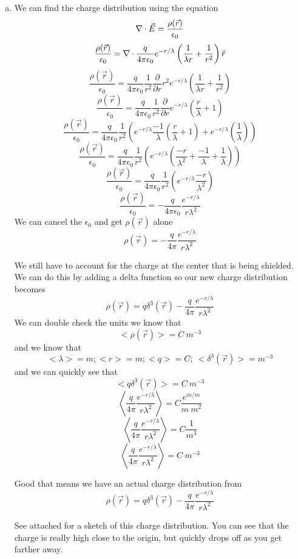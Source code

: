 \documentclass[11pt]{article}
\numberwithin{equation}{section}
\newcommand{\grad}{\bold\nabla}
\newcommand{\vecE}{\vec{E}}
\begin{document}
\begin{enumerate}[(a)]
\item
We can find the charge distribution using the equation
$$\grad\cdot\vecE = \frac{\rho(\vec{r})}{\epsilon_0}$$
$$\frac{\rho(\vec{r})}{\epsilon_0} = \grad\cdot\frac{q}{4\pi\epsilon_0}e^{-r/\lambda}\left(\frac{1}{\lambda r}+\frac{1}{r^{2}}\right)\hat{r}$$
$$\frac{\rho(\vec{r})}{\epsilon_0} = \frac{q}{4\pi\epsilon_0}\frac{1}{r^2}\frac{\partial}{\partial r}r^2e^{-r/\lambda}\left(\frac{1}{\lambda r}+\frac{1}{r^{2}}\right)$$
$$\frac{\rho(\vec{r})}{\epsilon_0} = \frac{q}{4\pi\epsilon_0}\frac{1}{r^2}\frac{\partial}{\partial r}e^{-r/\lambda}\left(\frac{r}{\lambda }+1\right)$$
$$\frac{\rho(\vec{r})}{\epsilon_0} = \frac{q}{4\pi\epsilon_0}\frac{1}{r^2}\left(e^{-r/\lambda}\frac{-1}{\lambda}\left(\frac{r}{\lambda }+1\right) + e^{-r/\lambda}\left(\frac{1}{\lambda}\right)\right)$$
$$\frac{\rho(\vec{r})}{\epsilon_0} = \frac{q}{4\pi\epsilon_0}\frac{1}{r^2}\left(e^{-r/\lambda}\left(\frac{-r}{\lambda^2}+\frac{-1}{\lambda} + \frac{1}{\lambda}\right)\right)$$
$$\frac{\rho(\vec{r})}{\epsilon_0} = \frac{q}{4\pi\epsilon_0}\frac{1}{r^2}\left(e^{-r/\lambda}\frac{-r}{\lambda^2}\right)$$
$$\frac{\rho(\vec{r})}{\epsilon_0} = -\frac{q}{4\pi\epsilon_0}\frac{e^{-r/\lambda}}{r\lambda^2}$$
We can cancel the $\epsilon_0$ and get $\rho(\vec{r})$ alone
$$\rho(\vec{r})= -\frac{q}{4\pi}\frac{e^{-r/\lambda}}{r\lambda^2}$$


We still have to account for the charge at the center that is being shielded. We can do this by adding a delta function so our new charge distribution becomes
$$\rho(\vec{r})=q\delta^3(\vec{r}) - \frac{q}{4\pi}\frac{e^{-r/\lambda}}{r\lambda^2}$$
We can double check the units we know that $$<\rho(\vec{r})> = C\ m^{-3}$$
and we know that 
$$<\lambda> = m; <r> = m; <q>=C ;\ <\delta^3(\vec{r})> = m^{-3}$$
and we can quickly see that
$$<q\delta^3(\vec{r})> = C\ m^{-3}$$
$$\left<\frac{q}{4\pi}\frac{e^{-r/\lambda}}{r\lambda^2}\right> = C \frac{e^{m/m}}{m\ m^2}$$
$$\left<\frac{q}{4\pi}\frac{e^{-r/\lambda}}{r\lambda^2}\right> = C \frac{1}{m^3}$$
$$\left<\frac{q}{4\pi}\frac{e^{-r/\lambda}}{r\lambda^2}\right> = C\ m^{-3}$$

Good that means we have an actual charge distribution from 
$$\rho(\vec{r})={q}\delta^3(\vec{r}) - \frac{q}{4\pi}\frac{e^{-r/\lambda}}{r\lambda^2}$$

See attached for a sketch of this charge distribution. You can see that the charge is really high close to the origin, but quickly drops off as you get farther away.


\end{enumerate}
\end{document}
